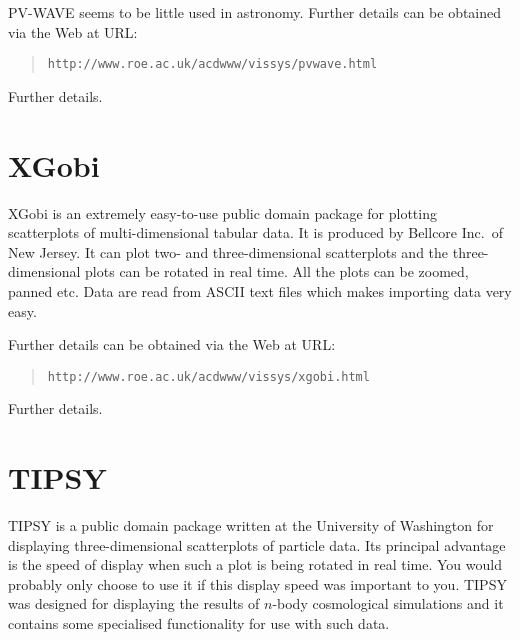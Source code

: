 \documentclass[twoside,11pt]{article}
\newcommand{\htmladdnormallink}[2]{#1}
\newenvironment{latexonly}{}{}
\newcommand{\xlabel}[1]{}
\begin{document}
PV-WAVE seems to be little used in astronomy.
\begin{latexonly}
Further details can be obtained via the Web at URL:

\begin{quote}
{\tt http://www.roe.ac.uk/acdwww/vissys/pvwave.html}
\end{quote}
\end{latexonly}

\begin{htmlonly}

\htmladdnormallink{Further details}
{http://www.roe.ac.uk/acdwww/vissys/pvwave.html}.
\end{htmlonly}


\section{XGobi \label{XGOBI} \xlabel{XGOBI} }

XGobi is an extremely easy-to-use public domain package for plotting
scatterplots of multi-dimensional tabular data. It is produced by
Bellcore Inc.\ of New Jersey. It can plot two- and three-dimensional
scatterplots and the three-dimensional plots can be rotated in real time.
All the plots can be zoomed, panned etc. Data are read from ASCII text
files which makes importing data very easy.

\begin{latexonly}
Further details can be obtained via the Web at URL:

\begin{quote}
{\tt http://www.roe.ac.uk/acdwww/vissys/xgobi.html}
\end{quote}
\end{latexonly}

\begin{htmlonly}
\htmladdnormallink{Further details}
{http://www.roe.ac.uk/acdwww/vissys/xgobi.html}.
\end{htmlonly}


\section{TIPSY \label{TIPSY} \xlabel{TIPSY} }

TIPSY is a public domain package written at the University of
Washington for displaying three-dimensional scatterplots of particle
data. Its principal advantage is the speed of display when such a
plot is being rotated in real time. You would probably only choose to
use it if this display speed was important to you. TIPSY was designed
for displaying the results of $n$-body cosmological simulations and it
contains some specialised functionality for use with such data.
\end{document}
